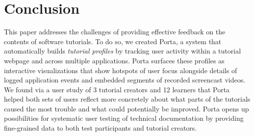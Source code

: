 \section{Conclusion}

This paper addresses the challenges of providing effective feedback on
the contents of software tutorials. To do so, we created Porta, a system
that automatically builds \emph{tutorial profiles} by tracking user activity within a tutorial webpage and across multiple applications.
Porta surfaces these profiles as interactive visualizations that show
hotspots of user focus alongside details of logged application events
and embedded segments of recorded screencast videos. We found via a user
study of 3 tutorial creators and 12 learners that Porta helped both sets
of users reflect more concretely about what parts of the tutorials
caused the most trouble and what could potentially be improved. Porta
opens up possibilities for systematic user testing of technical
documentation by providing fine-grained data to both test participants
and tutorial creators.

